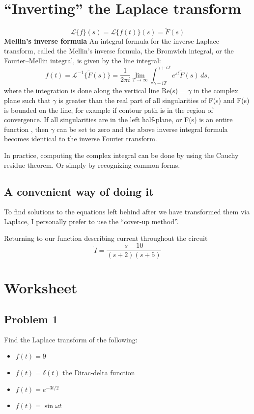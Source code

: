 \documentclass[11pt]{book}
\begin{document}
\newpage
\section{``Inverting'' the Laplace transform}
\begin{equation}
	{\mathcal  {L}}\{f\}(s)={\mathcal  {L}}\{f(t)\}(s)=\tilde{F}(s)
\end{equation}
\textbf{Mellin's inverse formula} An integral formula for the inverse Laplace transform, called the Mellin's inverse formula, the Bromwich integral, or the Fourier–Mellin integral, is given by the line integral:
\begin{equation}
	{\displaystyle f(t)={\mathcal {L}}^{-1}\{\tilde{F}(s)\}={\frac {1}{2\pi i}}\lim _{T\to \infty }\int _{\gamma -iT}^{\gamma +iT}e^{st}\tilde{F}(s)\,ds,}
\end{equation}
where the integration is done along the vertical line Re(s) = $\gamma$ in the complex plane such that $\gamma$ is greater than the real part of all singularities of F(s) and F(s) is bounded on the line, for example if contour path is in the region of convergence. If all singularities are in the left half-plane, or F(s) is an entire function , then $\gamma$ can be set to zero and the above inverse integral formula becomes identical to the inverse Fourier transform.

In practice, computing the complex integral can be done by using the Cauchy residue theorem. Or simply by recognizing common forms.

\subsection{A convenient way of doing it}
To find solutions to the equations left behind after we have transformed them via Laplace, I personally prefer to use the ``cover-up method''.

Returning to our function describing current throughout the circuit
\begin{equation}
	\tilde{I} = \frac{s - 10}{(s+2)(s+5)}
\end{equation}

\newpage
\section{Worksheet}
\subsection{Problem 1}
Find the Laplace transform of the following:
\begin{itemize}
	\item $f(t) = 9$
	\item $f(t) = \delta(t)$ the Dirac-delta function
	\item $f(t) = e^{-3t/2}$
	\item $f(t) = \sin\omega t$
\end{itemize}
\end{document}
